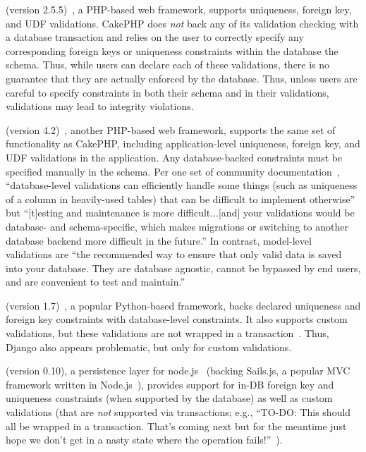  (version 2.5.5)~\cite{code-cakephp}, a PHP-based web
framework, supports uniqueness, foreign key, and UDF
validations. CakePHP does \textit{not} back any of its validation
checking with a database transaction and relies on the user to
correctly specify any corresponding foreign keys or uniqueness
constraints within the database the schema. Thus, while users can
declare each of these validations, there is no guarantee that they are
actually enforced by the database. Thus, unless users are careful to
specify constraints in both their schema and in their validations,
validations may lead to integrity violations.

 (version 4.2)~\cite{code-laravel}, another PHP-based web
framework, supports the same set of functionality as CakePHP,
including application-level uniqueness, foreign key, and UDF
validations in the application. Any database-backed constraints must
be specified manually in the schema. Per one set of community
documentation~\cite{laravel-book}, ``database-level validations can
efficiently handle some things (such as uniqueness of a column in
heavily-used tables) that can be difficult to implement otherwise''
but ``[t]esting and maintenance is more difficult...[and] your
validations would be database- and schema-specific, which makes
migrations or switching to another database backend more difficult in
the future.'' In contrast, model-level validations are ``the
recommended way to ensure that only valid data is saved into your
database. They are database agnostic, cannot be bypassed by end users,
and are convenient to test and maintain.'' 

 (version 1.7)~\cite{code-django}, a popular Python-based
framework, backs declared uniqueness and foreign key constraints with
database-level constraints. It also supports custom validations, but
these validations are not wrapped in a
transaction~\cite{code-django-constraints}. Thus, Django also appears
problematic, but only for custom validations.

 (version 0.10), a persistence layer for
node.js~\cite{code-waterline} (backing Sails.js, a popular MVC
framework written in Node.js~\cite{code-sails}), provides support for
in-DB foreign key and uniqueness constraints (when supported by the
database) as well as custom validations (that are \textit{not}
supported via transactions; e.g., ``TO-DO: This should all be wrapped
in a transaction. That's coming next but for the meantime just hope we
don't get in a nasty state where the operation
fails!''~\cite{code-waterline-txn}).

